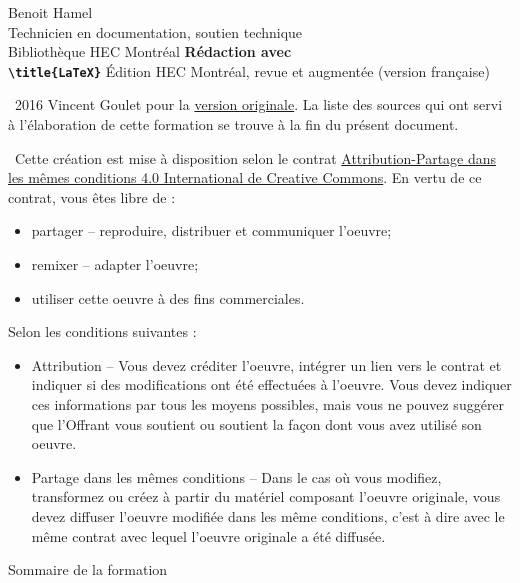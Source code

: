 
\begin{frame}
	Benoit Hamel \\
	Technicien en documentation, soutien technique \\
	Bibliothèque HEC Montréal
	\vfill
	{
		\Huge\bfseries
		Rédaction avec \\
		\texttt{\textbackslash title\{\textrm{\LaTeX}\}}
	}
	\vfill
	Édition HEC Montréal, revue et augmentée (version française)
\end{frame}

\begin{frame}
	\faCopyright\ 2016 Vincent Goulet pour la 
	\href{https://ctan.org/pkg/formation-latex-ul}{version originale}. La liste des sources qui ont 
	servi à l'élaboration de cette formation se trouve à la fin du présent document.
	
	\faCreativeCommons\ Cette création est mise à disposition selon le contrat 
	\href{http://creativecommons.org/licenses/by-sa/4.0/deed.fr}{%
	Attribution-Partage dans les mêmes conditions 4.0 International de Creative Commons}. 
	En vertu de ce contrat, vous êtes libre de :
	
	\begin{itemize}
		\item partager -- reproduire, distribuer et communiquer l’oeuvre;
		\item remixer -- adapter l’oeuvre;
		\item utiliser cette oeuvre à des fins commerciales.
	\end{itemize}

	Selon les conditions suivantes :
	
	\begin{itemize}
		\item Attribution -- Vous devez créditer l’oeuvre, intégrer un lien vers le contrat et indiquer si des modifications ont été effectuées à l’oeuvre. Vous devez indiquer ces informations par tous les moyens possibles, mais vous ne pouvez suggérer que l’Offrant vous soutient ou soutient la façon dont vous avez utilisé son oeuvre.
		\item Partage dans les mêmes conditions -- Dans le cas où vous modifiez, transformez ou créez à partir du matériel composant l’oeuvre
		originale, vous devez diffuser l’oeuvre modifiée dans les même conditions, c’est à dire avec le même contrat avec lequel l’oeuvre originale a été diffusée.
	\end{itemize}
\end{frame}

\begin{frame}{Sommaire de la formation}
	\tableofcontents
\end{frame}